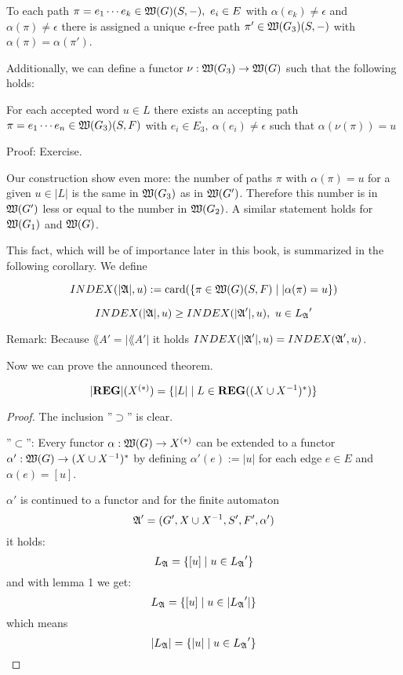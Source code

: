 \begin{corollary}
To each path $\pi = e_1 \cdots e_k \in \mbox{$\mathfrak{W}(G)$}(S, -),\ e_i \in E$ with
$\alpha(e_k) \neq \epsilon$ and $\alpha(\pi) \neq \epsilon$ there is assigned a
unique $\epsilon$-free path $\pi' \in \mbox{$\mathfrak{W}(G_3)$}(S, -)$ with $\alpha(\pi) =
\alpha(\pi')$.

Additionally, we can define a functor $\nu : \mbox{$\mathfrak{W}(G_3)$} \to \mbox{$\mathfrak{W}(G)$}$ such
that the following holds:

For each accepted word $u \in L$ there exists an accepting path $\pi = e_1
\cdots e_n \in \mbox{$\mathfrak{W}(G_3)$}(S, F)$ with $e_i \in E_3,\ \alpha(e_i) \neq \epsilon$ such
that $\alpha(\nu(\pi)) = u$
\end{corollary}

Proof: Exercise.

Our construction show even more: the number of paths $\pi$ with $\alpha(\pi) =
u$ for a given $u \in |L|$ is the same in $\mbox{$\mathfrak{W}(G_3)$}$ as in $\mbox{$\mathfrak{W}(G')$}$.
Therefore this number is in $\mbox{$\mathfrak{W}(G')$}$ less or equal to the number in
$\mbox{$\mathfrak{W}(G_2)$}$. A similar statement holds for $\mbox{$\mathfrak{W}(G_1)$}$ and
$\mbox{$\mathfrak{W}(G)$}$.

This fact, which will be of importance later in this book, is summarized in the
following corollary. We define

\begin{definition}
\[ INDEX(|\mbox{$\mathfrak{A}$}|, u) := \mathrm{card}(\mbox{$\{\pi \in \mbox{$\mathfrak{W}(G)$}(S, F) \mid
|\alpha(\pi) = u\}$}) \]
\end{definition}

\begin{corollary}
\[ INDEX(|\mbox{$\mathfrak{A}$}|, u) \geq INDEX(|\mbox{$\mathfrak{A}$}'|, u),\ u \in \mbox{$L_{\mathfrak{A}}$}' \]
\end{corollary}

Remark: Because $\lang{A}' = |\lang{A}'|$ it holds $INDEX(|\mbox{$\mathfrak{A}$}'|, u) =
INDEX(\mbox{$\mathfrak{A}$}', u)$.

Now we can prove the announced theorem.

\begin{theorem}
\[ |\mbox{{\bf REG}}|(\mbox{${X}^{(*)}$}) = \mbox{$\{|L| \mid L \in \mbox{{\bf REG}}((X\cup X^{-1})^*)\}$} \]
\end{theorem}

\begin{proof}
 The inclusion ''$\supset$'' is clear.
 
 ''$\subset$'': Every functor $\alpha : \mbox{$\mathfrak{W}(G)$} \to \mbox{${X}^{(*)}$}$ can be
 extended to a functor $\alpha' : \mbox{$\mathfrak{W}(G)$} \to (X \cup {X}^{-1})^*$ by
 defining $\alpha'(e) := |u|$ for each edge $e \in E$ and $\alpha(e) = [u]$.
 
 $\alpha'$ is continued to a functor and for the finite automaton
 \[ \mbox{$\mathfrak{A}$}' = (G', X \cup {X}^{-1}, S', F', \alpha') \]
 it holds:
 \[ \mbox{$L_{\mathfrak{A}}$} = \mbox{$\{[u] \mid u \in \mbox{$L_{\mathfrak{A}}$}'\}$} \]
 and with lemma 1 we get:
 \[ \mbox{$L_{\mathfrak{A}}$} = \mbox{$\{[u] \mid u \in |\mbox{$L_{\mathfrak{A}}$}'|\}$} \]
 which means
 \[ |\mbox{$L_{\mathfrak{A}}$}| = \mbox{$\{|u| \mid u \in \mbox{$L_{\mathfrak{A}}$}'\}$} \]
\end{proof}


